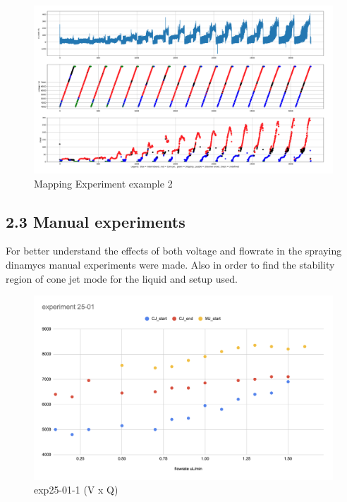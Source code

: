     \begin{figure}[H]
        \center
        \includegraphics[width=15cm]{joao_26-01-22/graphs-exp-26-01.png}
        \caption{Mapping Experiment example 2}
    \end{figure}





\subsection*{2.3 Manual experiments}

    For better understand the effects of both voltage and flowrate in the spraying dinamycs manual experiments were made.
    Also in order to find the stability region of cone jet mode for the liquid and setup used.


        \begin{figure}[H]
            \center
            \includegraphics[width=12cm]{joao_26-01-22/exp25-01-1.png}
            \caption{ exp25-01-1 (V x Q)}
        \end{figure}

